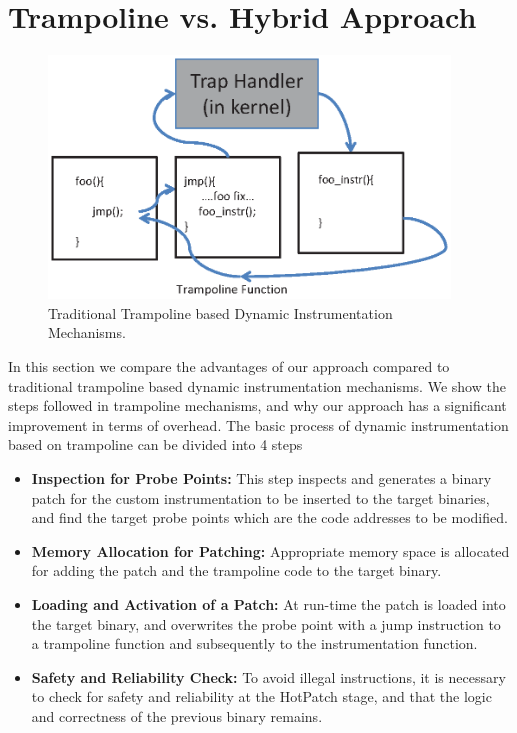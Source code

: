 \section{Trampoline vs. Hybrid Approach}
\label{sec:trampoline}

\begin{figure}[h!]
  \begin{center}

    \includegraphics[width=0.95\textwidth]{iprobe/Images/tramp.eps}
    \caption{Traditional Trampoline based Dynamic Instrumentation Mechanisms.}
    \label{fig:tramp}

  \end{center}
\end{figure}

In this section we compare the advantages of our approach compared to traditional trampoline based dynamic instrumentation mechanisms. 
We show the steps followed in trampoline mechanisms, and why our approach has a significant improvement in terms of overhead. 
The basic process of dynamic instrumentation based on trampoline can be divided into 4 steps

\begin{itemize}

\item \textbf{Inspection for Probe Points: } This step inspects and generates a binary patch for the custom instrumentation to be inserted to the target binaries, and find the target probe points which are the code addresses to be modified.

\item \textbf{Memory Allocation for Patching: } Appropriate memory space is allocated for adding the patch and the trampoline code to the target binary.

\item \textbf{Loading and Activation of a Patch: } At run-time the patch is loaded into the target binary, and overwrites the probe point with a jump instruction to a trampoline function and subsequently to the instrumentation function.

\item \textbf{Safety and Reliability Check: } To avoid illegal instructions, it is necessary to check for safety and reliability at the HotPatch stage, and that the logic and correctness of the previous binary remains. 
\end{itemize} 


